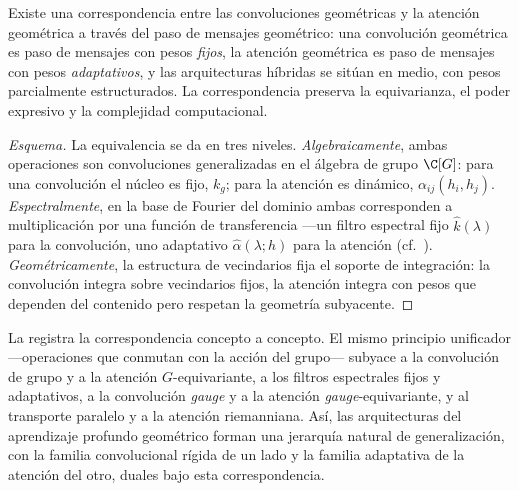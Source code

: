 \begin{theorem}
\label{thm:apps:cnn-attn-correspondence}
Existe una correspondencia entre las convoluciones geom\'etricas y la atenci\'on
geom\'etrica a trav\'es del paso de mensajes geom\'etrico: una convoluci\'on
geom\'etrica es paso de mensajes con pesos \emph{fijos}, la atenci\'on
geom\'etrica es paso de mensajes con pesos \emph{adaptativos}, y las
arquitecturas h\'ibridas se sit\'uan en medio, con pesos parcialmente
estructurados. La correspondencia preserva la equivarianza, el poder expresivo y
la complejidad computacional.
\end{theorem}

\begin{proof}[Esquema]
La equivalencia se da en tres niveles. \emph{Algebraicamente}, ambas operaciones
son convoluciones generalizadas en el \'algebra de grupo $\C[G]$: para una
convoluci\'on el n\'ucleo es fijo, $k_g$; para la atenci\'on es din\'amico,
$\alpha_{ij}(h_i, h_j)$. \emph{Espectralmente}, en la base de Fourier del dominio
ambas corresponden a multiplicaci\'on por una funci\'on de transferencia ---un
filtro espectral fijo $\hat{k}(\lambda)$ para la convoluci\'on, uno adaptativo
$\hat\alpha(\lambda;h)$ para la atenci\'on (cf.\
). \emph{Geom\'etricamente}, la estructura de
vecindarios fija el soporte de integraci\'on: la convoluci\'on integra sobre
vecindarios fijos, la atenci\'on integra con pesos que dependen del contenido
pero respetan la geometr\'ia subyacente.
\end{proof}

La  registra la correspondencia concepto a concepto. El
mismo principio unificador ---operaciones que conmutan con la acci\'on del
grupo--- subyace a la convoluci\'on de grupo y a la atenci\'on $G$-equivariante,
a los filtros espectrales fijos y adaptativos, a la convoluci\'on \emph{gauge} y
a la atenci\'on \emph{gauge}-equivariante, y al transporte paralelo y a la
atenci\'on riemanniana. As\'i, las arquitecturas del aprendizaje profundo
geom\'etrico forman una jerarqu\'ia natural de generalizaci\'on, con la familia
convolucional r\'igida de un lado y la familia adaptativa de la atenci\'on del
otro, duales bajo esta correspondencia.

